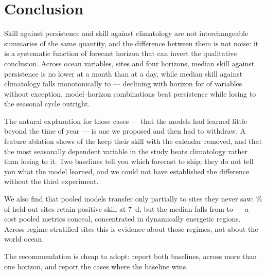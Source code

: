 \section{Conclusion}

Skill against persistence and skill against climatology are not interchangeable
summaries of the same quantity, and the difference between them is not noise:
it is a systematic function of forecast horizon that can invert the qualitative
conclusion. Across \NVars{} ocean variables, \NSites{} sites and four horizons,
median skill against persistence is no lower at a month than at a day, while
median skill against climatology falls monotonically to \MedSkillCThirty{} ---
declining with horizon for \NFallingClim{} of \NVars{} variables without
exception. \NLoseToClim{} model--horizon combinations beat persistence while
losing to the seasonal cycle outright.

The natural explanation for those cases --- that the models had learned little
beyond the time of year --- is one we proposed and then had to withdraw. A
feature ablation shows \NFlatteredNonSeasonal{} of the \NFlattered{} keep their
skill with the calendar removed, and that the most seasonally dependent
variable in the study beats climatology rather than losing to it. Two baselines
tell you which forecast to ship; they do not tell you what the model learned,
and we could not have established the difference without the third experiment.

We also find that pooled models transfer only partially to sites they never
saw: \LosoPositiveShare{}\% of held-out sites retain positive skill at
\SI{7}{\day}, but the median falls from \MedPooledSeven{} to
\MedLosoSeven{} --- a cost pooled metrics conceal, concentrated in dynamically
energetic regions. Across \NSites{} regime-stratified sites this is evidence
about those regimes, not about the world ocean.

The recommendation is cheap to adopt: report both baselines, across more than
one horizon, and report the cases where the baseline wins.
